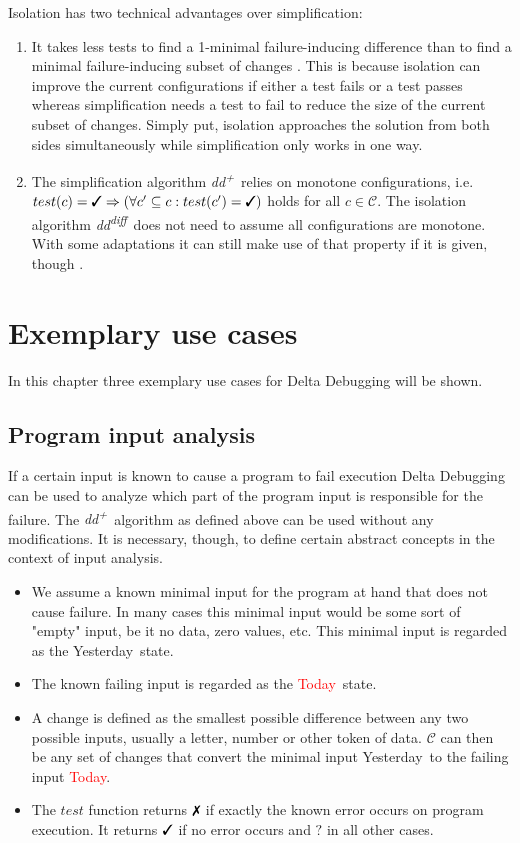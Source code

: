 \documentclass[a4paper,UKenglish]{lipics-v2018}
\newcommand{\ddp}{\textit{dd\textsuperscript{+}}}
\newcommand{\dddiff}{\textit{dd\textsuperscript{diff}}}
\newcommand{\green}[1]{\textcolor{td-green}{#1}}
\newcommand{\red}[1]{\textcolor{red}{#1}}
\newcommand{\yd}[0]{\green{Yesterday}}
\newcommand{\td}[0]{\red{Today}}
\newcommand{\C}[0]{\ensuremath{\mathcal{C}}}
\newcommand{\cmark}{\text{\ding{51}}}
\newcommand{\xmark}{\text{\ding{55}}}
\newcommand{\qmark}{\textbf{?}}
\begin{document}
Isolation has two technical advantages over simplification:
\begin{enumerate}
	\item It takes less tests to find a 1-minimal failure-inducing difference than to find a minimal failure-inducing subset of changes \cite{Zeller:2002:SIF:506201.506206}.
	This is because isolation can improve the current configurations if either a test fails or a test passes whereas simplification needs a test to fail to reduce the size of the current subset of changes. Simply put, isolation approaches the solution from both sides simultaneously while simplification only works in one way.
	\item The simplification algorithm \ddp\ relies on monotone configurations, i.e. $test(c)=\cmark \Rightarrow (\forall c' \subseteq c : test(c') = \cmark)$ holds for all $c \in \C$. The isolation algorithm \dddiff\ does not need to assume all configurations are monotone. With some adaptations it can still make use of that property if it is given, though \cite{Zeller:2002:SIF:506201.506206}.
\end{enumerate}

\section{Exemplary use cases}
\label{sec:use_cases}

In this chapter three exemplary use cases for Delta Debugging will be shown.

\subsection{Program input analysis}

If a certain input is known to cause a program to fail execution Delta Debugging can be used to analyze which part of the program input is responsible for the failure. The \ddp\ algorithm as defined above can be used without any modifications. It is necessary, though, to define certain abstract concepts in the context of input analysis.\\
\begin{itemize}
  	\item We assume a known minimal input for the program at hand that does not cause failure. In many cases this minimal input would be some sort of "empty" input, be it no data, zero values, etc. This minimal input is regarded as the \yd\ state.
  	\item The known failing input is regarded as the \td\ state.
  	\item A change is defined as the smallest possible difference between any two possible inputs, usually a letter, number or other token of data. $\C$ can then be any set of changes that convert the minimal input \yd\ to the failing input \td.
  	\item The $test$ function returns $\xmark$ if exactly the known error occurs on program execution. It returns $\cmark$ if no error occurs and $\qmark$ in all other cases. 
\end{itemize}
\end{document}
